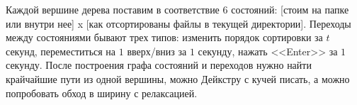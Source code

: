 Каждой вершине дерева поставим в соответствие $6$ состояний:
[стоим на папке или внутри нее] x [как отсортированы файлы в текущей директории].
Переходы между состояниями бывают трех типов:
изменить порядок сортировки за $t$ секунд,
переместиться на $1$ вверх/вниз за $1$ секунду,
нажать <<Enter>> за $1$ секунду.
После построения графа состояний и переходов
нужно найти крайчайшие пути из одной вершины, можно
Дейкстру с кучей писать, а можно попробовать обход в ширину с релаксацией.

